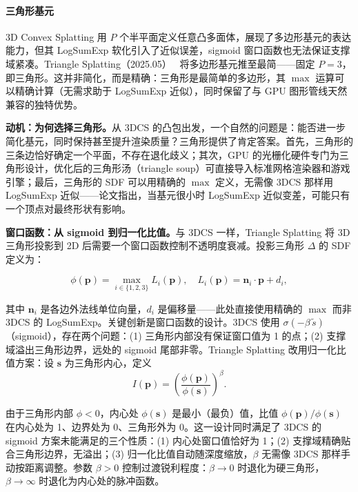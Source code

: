 \paragraph{三角形基元}

3D Convex Splatting 用 $P$ 个半平面定义任意凸多面体，展现了多边形基元的表达能力，但其 LogSumExp 软化引入了近似误差，sigmoid 窗口函数也无法保证支撑域紧凑。Triangle Splatting（2025.05）~\cite{2505_19175} 将多边形基元推至最简——固定 $P=3$，即三角形。这并非简化，而是精确：三角形是最简单的多边形，其 $\max$ 运算可以精确计算（无需求助于 LogSumExp 近似），同时保留了与 GPU 图形管线天然兼容的独特优势。

\textbf{动机：为何选择三角形。}从 3DCS 的凸包出发，一个自然的问题是：能否进一步简化基元，同时保持甚至提升渲染质量？三角形提供了肯定答案。首先，三角形的三条边恰好确定一个平面，不存在退化歧义；其次，GPU 的光栅化硬件专门为三角形设计，优化后的三角形汤（triangle soup）可直接导入标准网格渲染器和游戏引擎；最后，三角形的 SDF 可以用精确的 $\max$ 定义，无需像 3DCS 那样用 LogSumExp 近似——论文指出，当基元很小时 LogSumExp 近似变差，可能只有一个顶点对最终形状有影响。

\textbf{窗口函数：从 sigmoid 到归一化比值。}与 3DCS 一样，Triangle Splatting 将 3D 三角形投影到 2D 后需要一个窗口函数控制不透明度衰减。投影三角形 $\Delta$ 的 SDF 定义为：

\begin{equation}
    \phi(\mathbf{p}) = \max_{i \in \{1,2,3\}} L_i(\mathbf{p}), \quad L_i(\mathbf{p}) = \mathbf{n}_i \cdot \mathbf{p} + d_i,
\end{equation}

其中 $\mathbf{n}_i$ 是各边外法线单位向量，$d_i$ 是偏移量——此处直接使用精确的 $\max$ 而非 3DCS 的 LogSumExp。关键创新是窗口函数的设计。3DCS 使用 $\sigma(-\beta \, \tilde{s})$（sigmoid），存在两个问题：(1) 三角形内部没有保证窗口值为 1 的点；(2) 支撑域溢出三角形边界，远处的 sigmoid 尾部非零。Triangle Splatting 改用归一化比值方案：设 $\mathbf{s}$ 为三角形内心，定义
\begin{equation}
    I(\mathbf{p}) = \left(\frac{\phi(\mathbf{p})}{\phi(\mathbf{s})}\right)^{\!\beta}.
\end{equation}

由于三角形内部 $\phi < 0$，内心处 $\phi(\mathbf{s})$ 是最小（最负）值，比值 $\phi(\mathbf{p})/\phi(\mathbf{s})$ 在内心处为 1、边界处为 0、三角形外为 0。这一设计同时满足了 3DCS 的 sigmoid 方案未能满足的三个性质：(1) 内心处窗口值恰好为 1；(2) 支撑域精确贴合三角形边界，无溢出；(3) 归一化比值自动随深度缩放，$\beta$ 无需像 3DCS 那样手动按距离调整。参数 $\beta > 0$ 控制过渡锐利程度：$\beta \to 0$ 时退化为硬三角形，$\beta \to \infty$ 时退化为内心处的脉冲函数。

